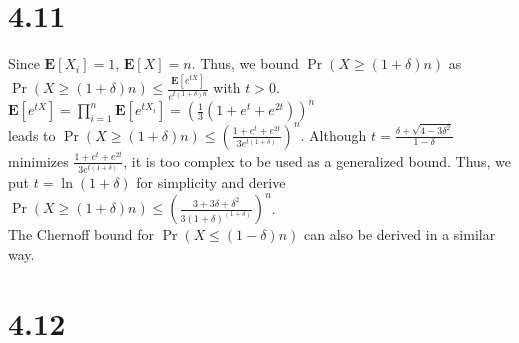 \documentclass{article}
\begin{document}
\section*{4.11}
Since $\textbf{E}[X_i]=1$, $\textbf{E}[X]=n$. Thus, we bound $\Pr(X\geq (1+\delta)n)$ as\\
$\Pr(X\geq (1+\delta)n)\leq\frac{\textbf{E}[e^{tX}]}{e^{t(1+\delta)n}}$ with $t>0$. $\textbf{E}[e^{tX}]=\prod\limits_{i=1}^n\textbf{E}[e^{tX_i}]=\left(\frac{1}{3}(1+e^t+e^{2t})\right)^n$\\
leads to $\Pr(X\geq (1+\delta)n)\leq\left(\frac{1+e^t+e^{2t}}{3e^{t(1+\delta)}}\right)^n$.
Although $t=\frac{\delta+\sqrt{4-3\delta^2}}{1-\delta}$ minimizes $\frac{1+e^t+e^{2t}}{3e^{t(1+\delta)}}$, it is too complex to be used as a generalized bound.
Thus, we put $t=\ln(1+\delta)$ for simplicity and derive $\Pr(X\geq (1+\delta)n)\leq\left(\frac{3+3\delta+\delta^2}{3(1+\delta)^{(1+\delta)}}\right)^n$.\\
The Chernoff bound for $\Pr(X\leq(1-\delta)n)$ can also be derived in a similar way.
\section*{4.12}
\end{document}
